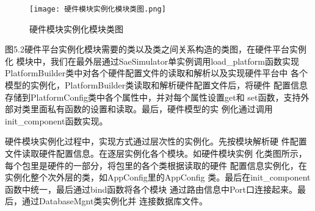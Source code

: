 \begin{figure}
    \centering
    \texttt{[image: 硬件模块实例化模块类图.png]}
    \caption{硬件模块实例化模块类图}
    \label{fig:badge}
\end{figure}

图5.2硬件平台实例化模块需要的类以及类之间关系构造的类图，在硬件平台实例化
模块中，我们在最外层通过SaeSimulator单实例调用load\_platform函数实现
PlatformBuilder类中对各个硬件配置文件的读取和解析以及实现硬件平台中
各个模型的实例化，PlatformBuilder类读取和解析硬件配置文件后，将硬件
配置信息存储到PlatformConfig类中各个属性中，并对每个属性设置get和
set函数，支持外部对类里面私有函数的设置和读取。最后，硬件模型的实
例化通过调用init\_component函数实现。

硬件模块实例化过程中，实现方式通过层次性的实例化。先按模块解析硬
件配置文件读取硬件配置信息。在逐层实例化各个模块。如硬件模块实例
化类图所示，每个包里是硬件的一部分，将包里的各个类根据读取的硬件
配置信息实例化，在实例化整个次外层的类，如AppConfig里的AppConfig
类。最后在init\_component函数中统一，最后通过bind函数将各个模块
通过路由信息中Port口连接起来。最后，通过DatabaseMgnt类实例化并
连接数据库文件。





